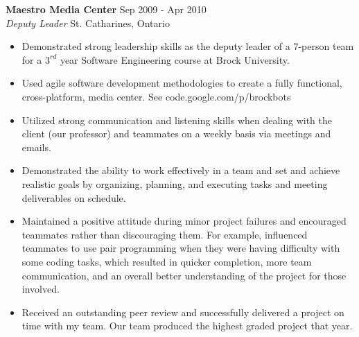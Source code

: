 \documentclass[margin]{res}
\begin{document}
\begin{resume}


	\textbf{Maestro Media Center} \hfill Sep 2009 - Apr 2010 \\
    {\sl Deputy Leader} \hfill St. Catharines, Ontario
	\begin{itemize}  \itemsep -2pt %
	  \item Demonstrated strong leadership skills as the deputy leader of a 7-person team for a $3^{rd}$
	  year Software Engineering course at Brock University.
	  \item Used agile software development methodologies to create a fully functional, cross-platform,
	  media center. See code.google.com/p/brockbots
	  \item Utilized strong communication and listening skills when dealing with the client
	  (our professor) and teammates on a weekly basis via meetings and emails.
	  \item Demonstrated the ability to work effectively in a team and set and achieve realistic
	  goals by organizing, planning, and executing tasks and meeting deliverables on schedule.
	  \item Maintained a positive attitude during minor project failures and encouraged teammates
	  rather than discouraging them. For example, influenced teammates to use pair programming
	  when they were having difficulty with some coding tasks, which resulted in quicker
	  completion, more team communication, and an overall better understanding of the project for
	  those involved.
	  \item Received an outstanding peer review and successfully delivered a project on time with my team.
	  Our team produced the highest graded project that year.
	\end{itemize}


\end{resume}
\end{document}
